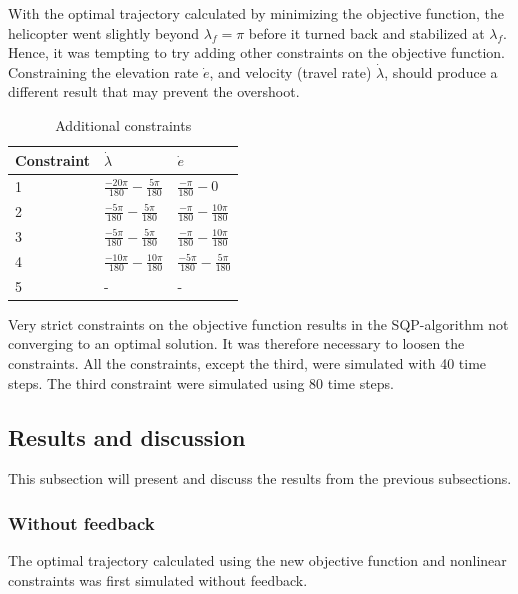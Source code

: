 With the optimal trajectory calculated by minimizing the objective function, the helicopter went slightly beyond $\lambda_f = \pi$ before it turned back and stabilized at $\lambda_f$. Hence, it was tempting to try adding other constraints on the objective function. Constraining the elevation rate $\dot{e}$, and velocity (travel rate) $\dot{\lambda}$, should produce a different result that may prevent the overshoot.
\begin{table}[H]
\centering
\label{constraints}
\renewcommand{\arraystretch}{1.1}
\caption{Additional constraints}
\begin{tabular}{lll}
\toprule
Constraint    &    $\dot{\lambda}$        & $\dot{e}$ \\
\midrule
1             & $\frac{-20\pi}{180} - \frac{5\pi}{180}$  & $\frac{-\pi}{180} - 0$                   \\
2             & $\frac{-5\pi}{180} - \frac{5\pi}{180}$ & $\frac{-\pi}{180} - \frac{10\pi}{180}$   \\
3             & $\frac{-5\pi}{180} - \frac{5\pi}{180}$ & $\frac{-\pi}{180} - \frac{10\pi}{180}$   \\
4             & $\frac{-10\pi}{180} - \frac{10\pi}{180}$ & $\frac{-5\pi}{180} - \frac{5\pi}{180}$   \\
5             & - & -   \\
\bottomrule
\end{tabular}
\end{table}

Very strict constraints on the objective function results in the SQP-algorithm not converging to an optimal solution. It was therefore necessary to loosen the constraints. All the constraints, except the third, were simulated with 40 time steps. The third constraint were simulated using 80 time steps. 

\subsection{Results and discussion}
This subsection will present and discuss the results from the previous subsections.
\subsubsection{Without feedback}
The optimal trajectory calculated using the new objective function and nonlinear constraints was first simulated without feedback.

